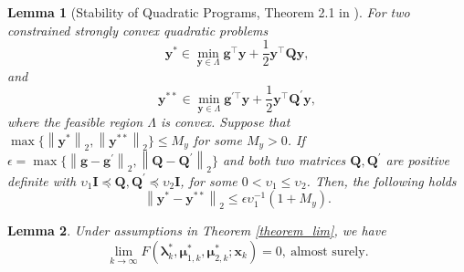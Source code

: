\documentclass[aos]{imsart}
\numberwithin{equation}{section}
\theoremstyle{plain}
\newtheorem{lemma}{Lemma}
\begin{document}
\begin{appendix}
\begin{lemma}
[Stability of Quadratic Programs, Theorem 2.1 in \cite{daniel1973stability}]
\label{lemma13}
    For two constrained strongly convex quadratic problems 
    \begin{equation*}
        \bm{y}^{*} \in \min_{\bm{y} \in \Lambda} \bm{g}^{\top} \bm{y} + \frac{1}{2} \bm{y}^{\top} \bm{Q} \bm{y},
    \end{equation*}
    and
    \begin{equation*}
        \bm{y}^{**} \in \min_{\bm{y} \in \Lambda} \bm{g}^{\prime \top} \bm{y} + \frac{1}{2} \bm{y}^{\top} \bm{Q}^{\prime} \bm{y},
    \end{equation*}
    where the feasible region $\Lambda$ is convex. Suppose that $\max \{\left\| \bm{y}^{*} \right\|_2, \left\| \bm{y}^{**} \right\|_2 \} \leq M_{y}$ for some $M_{y}>0$. If $\epsilon = \max\{\left\| \bm{g} - \bm{g}^{\prime} \right\|_2, \left\|  \bm{Q} - \bm{Q}^{\prime} \right\|_2 \}$ and both two matrices $\bm{Q}, \bm{Q}^{\prime}$ are positive definite with $\upsilon_1 \bm{I} \preceq \bm{Q}, \bm{Q}^{\prime} \preceq \upsilon_2 \bm{I}$, for some $0<\upsilon_1 \leq \upsilon_2 $. Then, the following holds
    \begin{equation*}
        \left\|\bm{y}^{*} - \bm{y}^{**}  \right\|_2 \leq \epsilon \upsilon_1^{-1} \left( 1 + M_{y} \right). 
    \end{equation*}
\end{lemma}

\begin{lemma}
\label{lemma_lim_kkt}
Under assumptions in Theorem \ref{theorem_lim}, we have 
    \begin{equation*}
        \lim_{k \to \infty} F(\bm{\lambda}_{k}^{*}, \bm{\mu}_{1,k}^{*}, \bm{\mu}_{2,k}^{*}; \bm{x}_k) = 0,~\text{almost surely}.
    \end{equation*}
\end{lemma}



\end{appendix}
\end{document}
